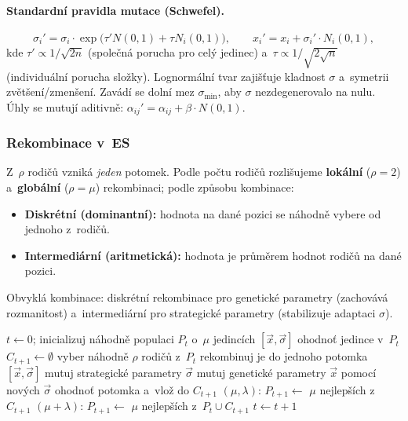 \documentclass[11pt,a4paper]{article}
\theoremstyle{definition}
\begin{document}
\paragraph{Standardní pravidla mutace (Schwefel).}
\[
\sigma_i' = \sigma_i \cdot \exp\big(\tau' N(0,1) + \tau N_i(0,1)\big),
\qquad
x_i' = x_i + \sigma_i' \cdot N_i(0,1),
\]
kde $\tau' \propto 1/\sqrt{2n}$ (společná porucha pro celý jedinec)
a~$\tau \propto 1/\sqrt{2\sqrt{n}}$ (individuální porucha složky).
Lognormální tvar zajišťuje kladnost $\sigma$ a~symetrii zvětšení/zmenšení.
Zavádí se dolní mez $\sigma_{\min}$, aby $\sigma$ nezdegenerovalo na nulu.
Úhly se mutují aditivně: $\alpha_{ij}' = \alpha_{ij} + \beta \cdot N(0,1)$.

\subsubsection{Rekombinace v~ES}

Z~$\rho$ rodičů vzniká \emph{jeden} potomek. Podle počtu rodičů rozlišujeme
\textbf{lokální} ($\rho = 2$) a~\textbf{globální} ($\rho = \mu$) rekombinaci;
podle způsobu kombinace:
\begin{itemize}
\item \textbf{Diskrétní (dominantní):} hodnota na dané pozici se náhodně vybere
  od jednoho z~rodičů.
\item \textbf{Intermediární (aritmetická):} hodnota je průměrem hodnot rodičů
  na dané pozici.
\end{itemize}
Obvyklá kombinace: diskrétní rekombinace pro genetické parametry
(zachovává rozmanitost) a~intermediární pro strategické parametry
(stabilizuje adaptaci $\sigma$).

\begin{algorithm}[!ht]
\caption{Obecný cyklus ES}
\begin{algorithmic}[1]
\State $t \gets 0$; inicializuj náhodně populaci $P_t$ o~$\mu$ jedincích $[\vec x, \vec\sigma]$
\State ohodnoť jedince v~$P_t$
  \State $C_{t+1} \gets \emptyset$
    \State vyber náhodně $\rho$ rodičů z~$P_t$
    \State rekombinuj je do jednoho potomka $[\vec x, \vec\sigma]$
    \State mutuj strategické parametry $\vec\sigma$
    \State mutuj genetické parametry $\vec x$ pomocí nových $\vec\sigma$
    \State ohodnoť potomka a~vlož do $C_{t+1}$
  \EndFor
  \State $(\mu,\lambda)$: $P_{t+1} \gets$ $\mu$ nejlepších z~$C_{t+1}$
  \State $(\mu+\lambda)$: $P_{t+1} \gets$ $\mu$ nejlepších z~$P_t \cup C_{t+1}$
  \State $t \gets t+1$
\EndWhile
\end{algorithmic}
\end{algorithm}
\end{document}
